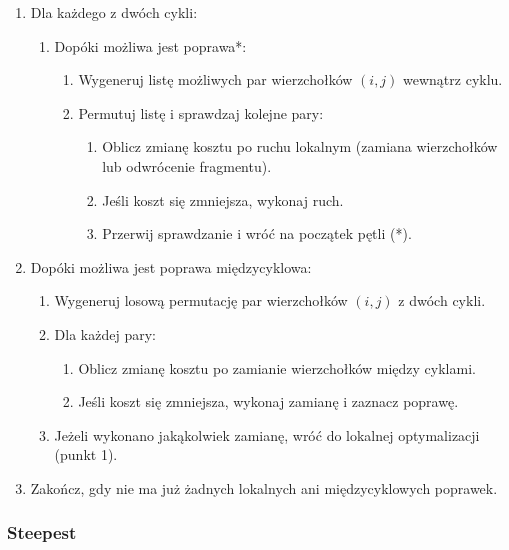 \documentclass[11pt]{article}
\begin{document}
\begin{enumerate}
    \item Dla każdego z dwóch cykli:
    \begin{enumerate}
        \item Dopóki możliwa jest poprawa*:
        \begin{enumerate}
            \item Wygeneruj listę możliwych par wierzchołków $(i, j)$ wewnątrz cyklu.
            \item Permutuj listę i sprawdzaj kolejne pary:
            \begin{enumerate}
                \item Oblicz zmianę kosztu po ruchu lokalnym (zamiana wierzchołków lub odwrócenie fragmentu).
                \item Jeśli koszt się zmniejsza, wykonaj ruch.
                \item Przerwij sprawdzanie i wróć na początek pętli (*).
            \end{enumerate}
        \end{enumerate}
    \end{enumerate}

    \item Dopóki możliwa jest poprawa międzycyklowa:
    \begin{enumerate}
        \item Wygeneruj losową permutację par wierzchołków $(i, j)$ z dwóch cykli.
        \item Dla każdej pary:
        \begin{enumerate}
            \item Oblicz zmianę kosztu po zamianie wierzchołków między cyklami.
            \item Jeśli koszt się zmniejsza, wykonaj zamianę i zaznacz poprawę.
        \end{enumerate}
        \item Jeżeli wykonano jakąkolwiek zamianę, wróć do lokalnej optymalizacji (punkt 1).
    \end{enumerate}

    \item Zakończ, gdy nie ma już żadnych lokalnych ani międzycyklowych poprawek.
\end{enumerate}


\subsubsection{Steepest}\label{subsec:steepest}
\end{document}
